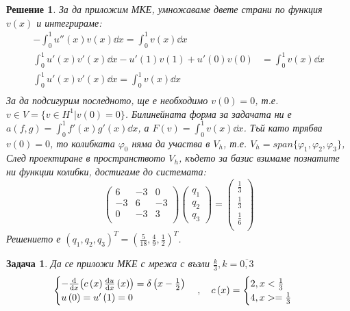 \documentclass[12pt]{article}
\newtheorem{problem}{Задача}
\newtheorem*{solution*}{Решение}
\begin{document}
\begin{large}
\begin{solution*}
За да приложим МКЕ, умножаваме двете страни по функция $v(x)$ и интегрираме:
\begin{align*}
-\int_{0}^{1}u''(x)v(x)\dd x = \int_{0}^{1}v(x)\dd x \\
\int_{0}^{1}u'(x)v'(x)\dd x - u'\left(1\right)v\left(1\right)+ u'\left(0\right)v\left(0\right) &= \int_{0}^{1}v(x)\dd x \\
\int_{0}^{1}u'(x)v'(x)\dd x = \int_{0}^{1}v(x)\dd x \\
\end{align*}
За да подсигурим последното, ще е необходимо $v\left(0\right)=0$, т.е. $v \in V = \{v \in H^1 \vert v\left(0\right)=0\}$. Билинейната форма за задачата ни е $a\left(f, g\right)=\int_{0}^{1}f'(x)g'(x)\dd x$, а $F\left(v\right)=\int_{0}^{1}v(x)\dd x$. Тъй като трябва $v(0)=0$, то колибката $\varphi_0$ няма да участва в $V_h$, т.е. $V_h = span\{\varphi_1, \varphi_2, \varphi_3\}$,  След проектиране в пространството $V_h$, където за базис взимаме познатите ни функции колибки,  достигаме до системата: 
\begin{equation}
	\begin{pmatrix}
	6 & -3 & 0 \\
	-3 & 6 & -3 \\
	0 & -3 & 3 \\
	\end{pmatrix}
	\begin{pmatrix}
      q_1 \\
      q_2 \\
      q_3
    \end{pmatrix}
    =
    \begin{pmatrix}
      \frac{1}{3} \\
      \frac{1}{3} \\
      \frac{1}{6} \\
    \end{pmatrix}
\end{equation}
Решението е $(q_1, q_2, q_3)^T = (\frac{5}{18}, \frac{4}{9}, \frac{1}{2})^T$.
\end{solution*}

\begin{problem}
Да се приложи МКЕ с мрежа с възли $\frac{k}{3}, k=\overline{0,3}$ 
\begin{equation}
    \begin{cases}
      -\dv{x}(c\left(x\right)\dv{u}{x}\left(x\right)) = \delta\left(x-\frac{1}{2}\right) \\
      u\left(0\right)=u'\left(1\right)=0
    \end{cases} , \quad
    c\left(x\right)
    =
    \begin{cases}
      2, x<\frac{1}{3} \\
      4, x>=\frac{1}{3} \\
    \end{cases} \\
\end{equation}
\end{problem}


\end{large}
\end{document}
